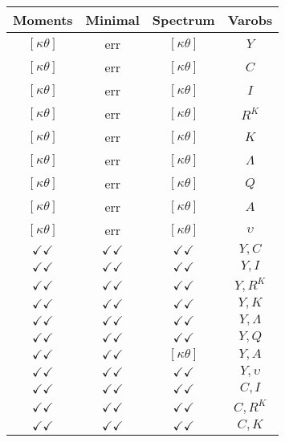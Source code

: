 \documentclass[a4paper,10pt]{article}
\begin{document}
\centering
\begin{longtable}{|c|c|c|c|}
\hline
Moments & Minimal & Spectrum & Varobs \\
\hline
$[\kappa \theta ]$ & err & $[\kappa \theta ]$ & ${Y}$ \\
\hline
$[\kappa \theta ]$ & err & $[\kappa \theta ]$ & ${C}$ \\
\hline
$[\kappa \theta ]$ & err & $[\kappa \theta ]$ & ${I}$ \\
\hline
$[\kappa \theta ]$ & err & $[\kappa \theta ]$ & ${R^{K}}$ \\
\hline
$[\kappa \theta ]$ & err & $[\kappa \theta ]$ & ${K}$ \\
\hline
$[\kappa \theta ]$ & err & $[\kappa \theta ]$ & ${\Lambda}$ \\
\hline
$[\kappa \theta ]$ & err & $[\kappa \theta ]$ & ${Q}$ \\
\hline
$[\kappa \theta ]$ & err & $[\kappa \theta ]$ & ${A}$ \\
\hline
$[\kappa \theta ]$ & err & $[\kappa \theta ]$ & ${\upsilon}$ \\
\hline
$\checkmark\checkmark$ & $\checkmark\checkmark$ & $\checkmark\checkmark$ & ${Y},{C}$ \\
\hline
$\checkmark\checkmark$ & $\checkmark\checkmark$ & $\checkmark\checkmark$ & ${Y},{I}$ \\
\hline
$\checkmark\checkmark$ & $\checkmark\checkmark$ & $\checkmark\checkmark$ & ${Y},{R^{K}}$ \\
\hline
$\checkmark\checkmark$ & $\checkmark\checkmark$ & $\checkmark\checkmark$ & ${Y},{K}$ \\
\hline
$\checkmark\checkmark$ & $\checkmark\checkmark$ & $\checkmark\checkmark$ & ${Y},{\Lambda}$ \\
\hline
$\checkmark\checkmark$ & $\checkmark\checkmark$ & $\checkmark\checkmark$ & ${Y},{Q}$ \\
\hline
$\checkmark\checkmark$ & $\checkmark\checkmark$ & $[\kappa \theta ]$ & ${Y},{A}$ \\
\hline
$\checkmark\checkmark$ & $\checkmark\checkmark$ & $\checkmark\checkmark$ & ${Y},{\upsilon}$ \\
\hline
$\checkmark\checkmark$ & $\checkmark\checkmark$ & $\checkmark\checkmark$ & ${C},{I}$ \\
\hline
$\checkmark\checkmark$ & $\checkmark\checkmark$ & $\checkmark\checkmark$ & ${C},{R^{K}}$ \\
\hline
$\checkmark\checkmark$ & $\checkmark\checkmark$ & $\checkmark\checkmark$ & ${C},{K}$ \\

\end{longtable}
\end{document}
